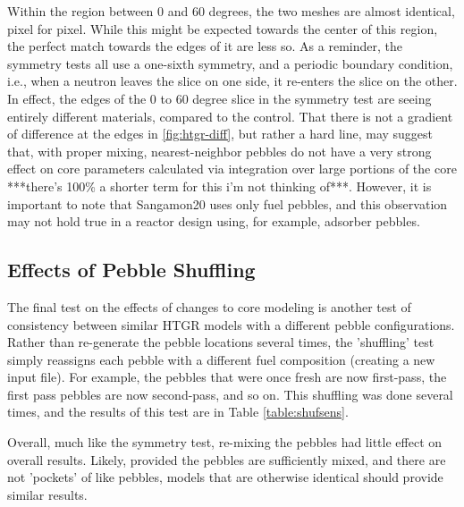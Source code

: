 

Within the region between 0 and 60 degrees, the two meshes are almost identical, pixel for pixel.  While this might be expected towards the center of this region, the perfect match towards the edges of it are less so.  As a reminder, the symmetry tests all use a one-sixth symmetry, and a periodic boundary condition, i.e., when a neutron leaves the slice on one side, it re-enters the slice on the other.  In effect, the edges of the 0 to 60 degree slice in the symmetry test are seeing entirely different materials, compared to the control.  That there is not a gradient of difference at the edges in \ref{fig:htgr-diff}, but rather a hard line, may suggest that, with proper mixing, nearest-neighbor pebbles do not have a very strong effect on core parameters calculated via integration over large portions of the core ***there's 100\% a shorter term for this i'm not thinking of***.  However, it is important to note that Sangamon20 uses only fuel pebbles, and this observation may not hold true in a reactor design using, for example, adsorber pebbles. 


\subsection{Effects of Pebble Shuffling}

The final test on the effects of changes to core modeling is another test of consistency between similar HTGR models with a different pebble configurations.  Rather than re-generate the pebble locations several times, the 'shuffling' test simply reassigns each pebble with a different fuel composition (creating a new input file).  For example, the pebbles that were once fresh are now first-pass, the first pass pebbles are now second-pass, and so on.  This shuffling was done several times, and the results of this test are in Table \ref{table:shufsens}.



Overall, much like the symmetry test, re-mixing the pebbles had little effect on overall results.  Likely, provided the pebbles are sufficiently mixed, and there are not 'pockets' of like pebbles, models that are otherwise identical should provide similar results. 